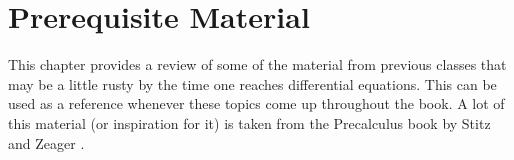 \chapter{Prerequisite Material}
\label{chap:prereq}
\renewcommand{\thesection}{\thechapter.\the\value{section}}

This chapter provides a review of some of the material from previous classes that 
may be a little rusty by the time one reaches differential equations. This can be used as a reference whenever 
these topics come up throughout the book. A lot of this material (or inspiration for it) is taken from the Precalculus book by Stitz and Zeager \cite{SZ}. 






\sectionnewpage



\sectionnewpage


